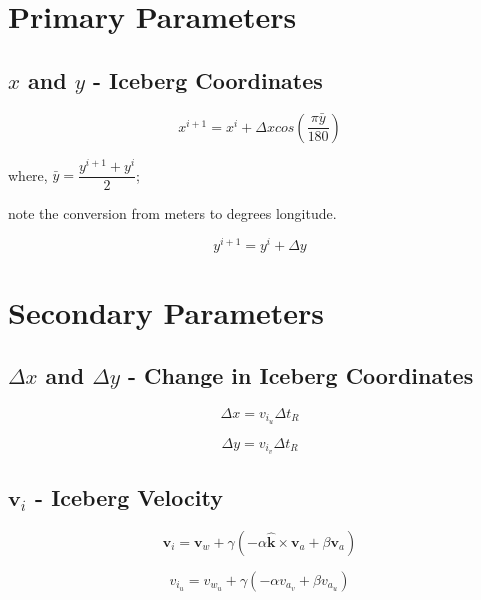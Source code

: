 \documentclass[12pt]{article}
\begin{document}
\section{Primary Parameters}

\subsection{$x$ and $y$ - Iceberg Coordinates}

\begin{equation}
x^{i+1} = x^{i} + \Delta x cos(\dfrac{\pi \bar{y}}{180})
\end{equation}

where, $\bar{y} = \dfrac{y^{i+1}+y^i}{2}$;

note the conversion from meters to degrees longitude.

\begin{equation}
y^{i+1} = y^i + \Delta{y}
\end{equation}

\section{Secondary Parameters}

\subsection{$\Delta x$ and $\Delta y$ - Change in Iceberg Coordinates}

\begin{equation}
\Delta x = v_{i_u} \Delta t_R
\end{equation}

\begin{equation}
\Delta y = v_{i_v} \Delta t_R
\end{equation}

\subsection{$\textbf{v}_i$ - Iceberg Velocity}

\begin{equation}
\textbf{v}_i = \textbf{v}_w + \gamma(-\alpha \boldsymbol{\hat{k}} \times
               \textbf{v}_a + \beta \textbf{v}_a)
\end{equation}

\begin{equation}
v_{i_u} = v_{w_u} + \gamma(-\alpha v_{a_v} + \beta v_{a_u})
\end{equation}
\end{document}
